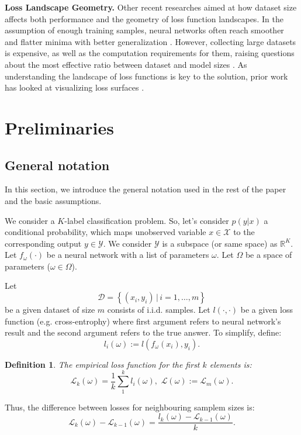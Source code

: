 \documentclass{article}
\newtheorem{definition}{Definition}
\begin{document}
\textbf{Loss Landscape Geometry.}
Other recent researches aimed at how dataset size affects both performance and the geometry of loss function landscapes.
In the assumption of enough training samples, neural networks often reach smoother and flatter minima with better
generalization \cite{wu2017towards}. However, collecting large datasets is expensive, as well as the computation
requirements for them, raising questions about the most effective ratio between dataset and model sizes
\cite{hoffmann2022training}. As understanding the landscape of loss functions is key to the solution, prior work has looked
at visualizing loss surfaces \cite{li2018visualizing}.

\section{Preliminaries}\label{sec:prelim}

\subsection{General notation}

In this section, we introduce the general notation used in the rest of the paper and the basic assumptions.

We consider a $K$-label classification problem.
So, let's consider $p(y|x)$ a conditional probability, which maps unobserved variable $x \in \mathcal{X}$ to the corresponding
output $y \in \mathcal{Y}$. We consider $\mathcal{Y}$ is a subspace (or same space) as $\mathbb{R}^K$. Let $f_{\omega}(\cdot)$
be a neural network with a list of parameters $\omega$. Let $\Omega$ be a space of parameters ($\omega \in \Omega$).

Let
$$\mathcal{D} = \left\{ (x_i, y_i) \, | \, i = 1, \dots, m \right\}$$
be a given dataset of size $m$ consists of i.i.d.
samples. Let $l(\cdot, \cdot)$ be a given loss function (e.g. cross-entrophy) where first argument refers to neural network's
result and the second argument refers to the true answer. To simplify, define: $$l_i(\omega) := l(f_{\omega}(x_i), y_i).$$

\begin{definition}
  The empirical loss function for the first $k$ elements is:
  $$\mathcal{L}_k(\omega) = \frac1k \sum\limits_1^k l_i(\omega), \,\, \mathcal{L}(\omega) := \mathcal{L}_m(\omega).$$
\end{definition}

Thus, the difference between losses for neighbouring samplem sizes is:
$$\mathcal{L}_{k}(\omega) - \mathcal{L}_{k-1}(\omega) = \frac{l_{k}(\omega) - \mathcal{L}_{k-1}(\omega)}{k}.$$
\end{document}
